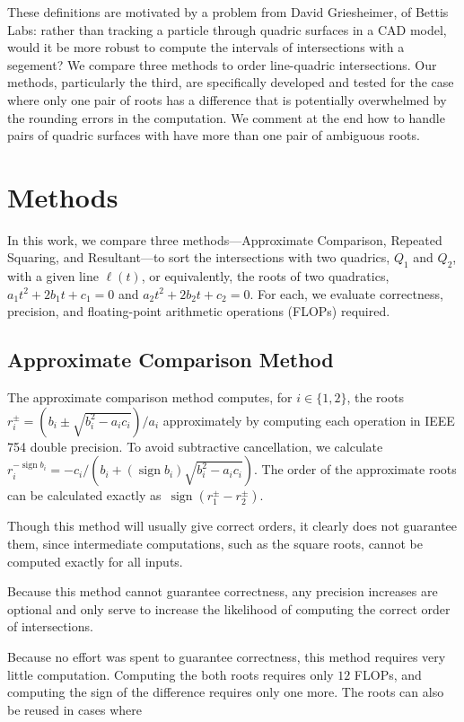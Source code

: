 \documentclass{cccg16}
\DeclareMathOperator{\sign}{sign}
\begin{document}
These definitions are motivated by a problem from David Griesheimer,
of Bettis Labs: rather than tracking a particle through quadric
surfaces in a CAD model, would it be more robust to compute the
intervals of intersections with a segement?  We compare three methods
to order line-quadric intersections.  Our methods, particularly the
third, are specifically developed and tested for the case where only
one pair of roots has a difference that is potentially overwhelmed by
the rounding errors in the computation. We comment at the end how to
handle pairs of quadric surfaces with have more than one pair of
ambiguous roots.

\section{Methods}
In this work, we compare three methods---Approximate Comparison,
Repeated Squaring, and Resultant---to sort the intersections with two
quadrics, $Q_1$ and $Q_2$, with a given line $\ell(t)$, or
equivalently, the roots of two quadratics, $a_1t^2+2b_1t+c_1=0$ and
$a_2t^2+2b_2t+c_2=0$.  For each, we evaluate correctness, precision,
and floating-point arithmetic operations (FLOPs) required.

\subsection{Approximate Comparison Method}
The approximate comparison method computes, for $i\in\{1, 2\}$, the
roots~$r_i^\pm=({b_i\pm\sqrt{b_i^2-a_ic_i}})/{a_i}$ approximately by
computing each operation in IEEE 754 double precision.  To avoid
subtractive cancellation, we calculate $r_i^{-\sign
  b_i}=-c_i/({b_i+(\sign{b_i})\sqrt{b_i^2-a_ic_i}}).$ The order of the
approximate roots can be calculated exactly
as~$\sign(r_1^\pm-r_2^\pm)$.


Though this method will usually give correct orders, it clearly does
not guarantee them, since intermediate computations, such as the
square roots, cannot be computed exactly for all inputs.

Because this method cannot guarantee correctness, any precision
increases are optional and only serve to increase the likelihood of
computing the correct order of intersections.

Because no effort was spent to guarantee correctness, this method
requires very little computation.  Computing the both roots requires
only $12$ FLOPs, and computing the sign of the difference requires
only one more.  The roots can also be reused in cases where 
\end{document}
